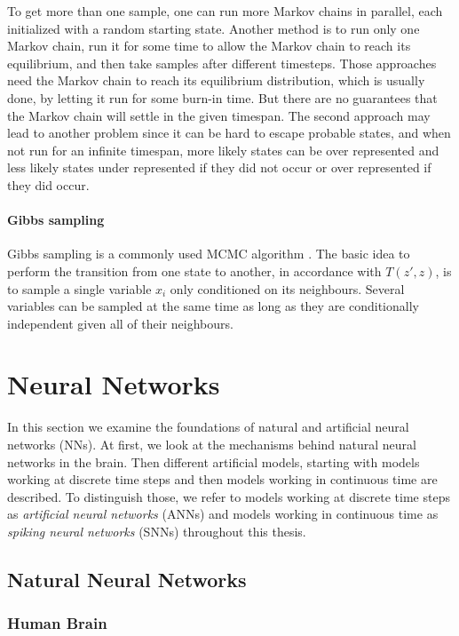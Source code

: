 To get more than one sample, one can run more Markov chains in parallel, each initialized with a random starting state. 
Another method is to run only one Markov chain, run it for some time to allow the Markov chain to reach its equilibrium, and then take samples after different timesteps.
Those approaches need the Markov chain to reach its equilibrium distribution, which is usually done, by letting it run for some burn-in time.
But there are no guarantees that the Markov chain will settle in the given timespan.    
The second approach may lead to another problem since it can be hard to escape probable states, and when not run for an infinite timespan, more likely states can be over represented and less likely states under represented if they did not occur or over represented if they did occur.  

\paragraph{Gibbs sampling} Gibbs sampling is a commonly used MCMC algorithm \cite{Goodfellow-et-al-2016-Book}. The basic idea to perform the transition from one state to another, in accordance with $T(z',z)$, is to sample a single variable $x_i$ only conditioned on its neighbours. 
Several variables can be sampled at the same time as long as they are conditionally independent given all of their neighbours.

\section{Neural Networks} \label{c:NNs}

In this section we examine the foundations of natural and artificial neural networks (NNs).
At first, we look at the mechanisms behind natural neural networks in the brain.
Then different artificial models, starting with models working at discrete time steps and then models working in continuous time are described.
To distinguish those, we refer to models working at discrete time steps as \textit{artificial neural networks} (ANNs) and models working in continuous time as \textit{spiking neural networks} (SNNs) throughout this thesis.

\subsection{Natural Neural Networks} \label{c:natural}
\subsubsection{Human Brain} \label{c:brain}

